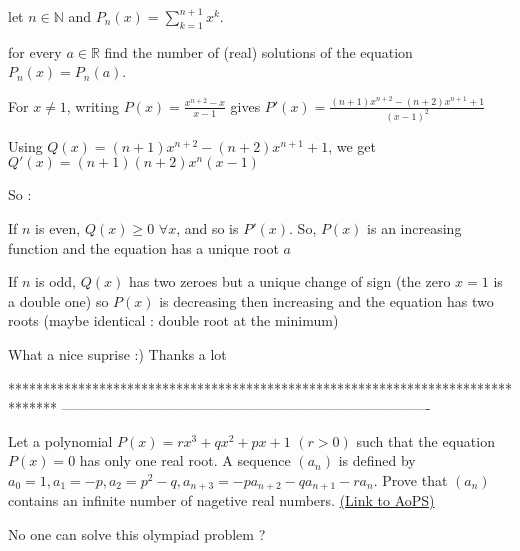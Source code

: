 \begin{solution}
	\begin{tcolorbox}let $ n\in\mathbb{N}$ and $ P_n(x) = \sum_{k = 1}^{n + 1}x^k$.

for every $ a\in\mathbb{R}$ find the number of (real) solutions of the equation $ P_n(x) = P_n(a)$.\end{tcolorbox}

For $ x\neq 1$, writing $ P(x)=\frac{x^{n+2}-x}{x-1}$ gives $ P'(x)=\frac{(n+1)x^{n+2}-(n+2)x^{n+1}+1}{(x-1)^2}$

Using $ Q(x)=(n+1)x^{n+2}-(n+2)x^{n+1}+1$, we get $ Q'(x)=(n+1)(n+2)x^n(x-1)$

So :

If $ n$ is even, $ Q(x)\geq 0$ $ \forall x$, and so is $ P'(x)$. So, $ P(x)$ is an increasing function and the equation has a unique root $ a$

If $ n$ is odd, $ Q(x)$ has two zeroes but a unique change of sign (the zero $ x=1$ is a double one) so $ P(x)$ is decreasing then increasing and the equation has two roots (maybe identical : double root at the minimum)
\end{solution}



\begin{solution}
	What a nice suprise  :)  Thanks a lot
\end{solution}
*******************************************************************************
-------------------------------------------------------------------------------

\begin{problem}
	Let a polynomial $ P(x) = rx^3 + qx^2 + px + 1$ $ (r > 0)$ such that the equation $ P(x) = 0$ has only one real root. A sequence $ (a_n)$ is defined by $ a_0 = 1, a_1 = - p, a_2 = p^2 - q, a_{n + 3} = - pa_{n + 2} - qa_{n + 1} - ra_n$.
Prove that $ (a_n)$ contains an infinite number of nagetive real numbers.
	\flushright \href{https://artofproblemsolving.com/community/c6h272562}{(Link to AoPS)}
\end{problem}



\begin{solution}
	No one can solve this olympiad problem ?
\end{solution}




